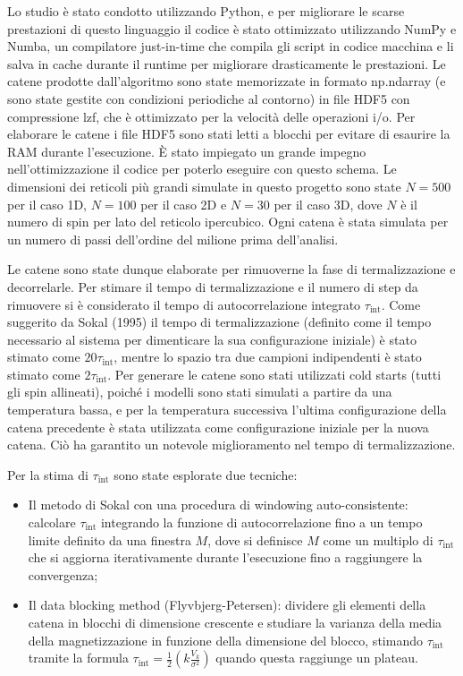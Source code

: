 \documentclass[11pt,a4paper]{article}
\begin{document}
Lo studio è stato condotto utilizzando Python, e per migliorare le scarse prestazioni di questo linguaggio il codice è stato ottimizzato utilizzando NumPy e Numba, un compilatore just-in-time che compila gli script in codice macchina e li salva in cache durante il runtime per migliorare drasticamente le prestazioni. Le catene prodotte dall'algoritmo sono state memorizzate in formato np.ndarray (e sono state gestite con condizioni periodiche al contorno) in file HDF5 con compressione lzf, che è ottimizzato per la velocità delle operazioni i/o. Per elaborare le catene i file HDF5 sono stati letti a blocchi per evitare di esaurire la RAM durante l'esecuzione. È stato impiegato un grande impegno nell'ottimizzazione il codice per poterlo eseguire con questo schema. Le dimensioni dei reticoli più grandi simulate in questo progetto sono state $N = 500$ per il caso 1D, $N = 100$ per il caso 2D e $N = 30$ per il caso 3D, dove $N$ è il numero di spin per lato del reticolo ipercubico. Ogni catena è stata simulata per un numero di passi dell'ordine del milione prima dell'analisi.

Le catene sono state dunque elaborate per rimuoverne la fase di termalizzazione e decorrelarle. Per stimare il tempo di termalizzazione e il numero di step da rimuovere si è considerato il tempo di autocorrelazione integrato $\tau_{\text{int}}$. Come suggerito da Sokal (1995) il tempo di termalizzazione (definito come il tempo necessario al sistema per dimenticare la sua configurazione iniziale) è stato stimato come $20 \tau_{\text{int}}$, mentre lo spazio tra due campioni indipendenti è stato stimato come $2 \tau_{\text{int}}$. Per generare le catene sono stati utilizzati cold starts (tutti gli spin allineati), poiché i modelli sono stati simulati a partire da una temperatura bassa, e per la temperatura successiva l'ultima configurazione della catena precedente è stata utilizzata come configurazione iniziale per la nuova catena. Ciò ha garantito un notevole miglioramento nel tempo di termalizzazione.

Per la stima di $\tau_{\text{int}}$ sono state esplorate due tecniche:

\begin{itemize}[leftmargin=*,itemsep=0.25em]
	\item Il metodo di Sokal con una procedura di windowing auto-consistente: calcolare $\tau_{\text{int}}$ integrando la funzione di autocorrelazione fino a un tempo limite definito da una finestra $M$, dove si definisce $M$ come un multiplo di $\tau_{\text{int}}$ che si aggiorna iterativamente durante l'esecuzione fino a raggiungere la convergenza;
	\item Il data blocking method (Flyvbjerg-Petersen): dividere gli elementi della catena in blocchi di dimensione crescente e studiare la varianza della media della magnetizzazione in funzione della dimensione del blocco, stimando $\tau_{\text{int}}$ tramite la formula $\tau_{\text{int}} = \frac{1}{2} \left( k \frac{V_k}{\sigma^2}\right)$ quando questa raggiunge un plateau.
\end{itemize}
\end{document}

